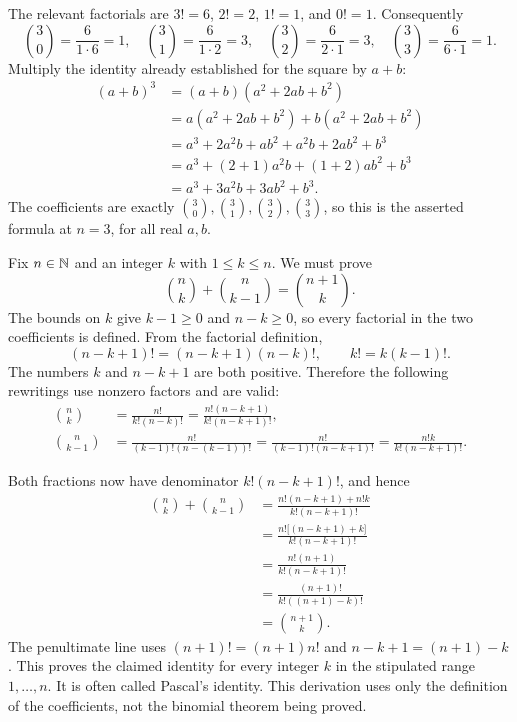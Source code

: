 The relevant factorials are $3!=6$, $2!=2$, $1!=1$, and $0!=1$.
Consequently
\[
 \binom30=\frac{6}{1\cdot6}=1,
 \quad
 \binom31=\frac{6}{1\cdot2}=3,
 \quad
 \binom32=\frac{6}{2\cdot1}=3,
 \quad
 \binom33=\frac{6}{6\cdot1}=1.
\]
Multiply the identity already established for the square by $a+b$:
\begin{align*}
 (a+b)^3
 &=(a+b)(a^2+2ab+b^2)\\
 &=a(a^2+2ab+b^2)+b(a^2+2ab+b^2)\\
 &=a^3+2a^2b+ab^2+a^2b+2ab^2+b^3\\
 &=a^3+(2+1)a^2b+(1+2)ab^2+b^3\\
 &=a^3+3a^2b+3ab^2+b^3.
\end{align*}
The coefficients are exactly $\binom30,\binom31,\binom32,\binom33$,
so this is the asserted formula at $n=3$, for all real $a,b$.

Fix $n\in\mathbb{N}$ and an integer $k$ with $1\leq k\leq n$. We must prove
\[
 \binom nk+\binom n{k-1}=\binom{n+1}{k}.
\]
The bounds on $k$ give $k-1\geq0$ and $n-k\geq0$, so every
factorial in the two coefficients is defined. From the factorial
definition,
\[
 (n-k+1)!=(n-k+1)(n-k)!,
 \qquad
 k!=k(k-1)!.
\]
The numbers $k$ and $n-k+1$ are both positive. Therefore the following
rewritings use nonzero factors and are valid:
\begin{align*}
 \binom nk
 &=\frac{n!}{k!(n-k)!}
 =\frac{n!(n-k+1)}{k!(n-k+1)!},\\
 \binom n{k-1}
 &=\frac{n!}{(k-1)!(n-(k-1))!}
 =\frac{n!}{(k-1)!(n-k+1)!}
 =\frac{n!k}{k!(n-k+1)!}.
\end{align*}

Both fractions now have denominator $k!(n-k+1)!$, and hence
\begin{align*}
 \binom nk+\binom n{k-1}
 &=\frac{n!(n-k+1)+n!k}{k!(n-k+1)!}\\
 &=\frac{n!\bigl[(n-k+1)+k\bigr]}{k!(n-k+1)!}\\
 &=\frac{n!(n+1)}{k!(n-k+1)!}\\
 &=\frac{(n+1)!}{k!((n+1)-k)!}\\
 &=\binom{n+1}{k}.
\end{align*}
The penultimate line uses $(n+1)!=(n+1)n!$ and
$n-k+1=(n+1)-k$. This proves the claimed identity for every integer
$k$ in the stipulated range $1,\ldots,n$. It is often called
Pascal's identity. This derivation uses only the definition of the
coefficients, not the binomial theorem being proved.

